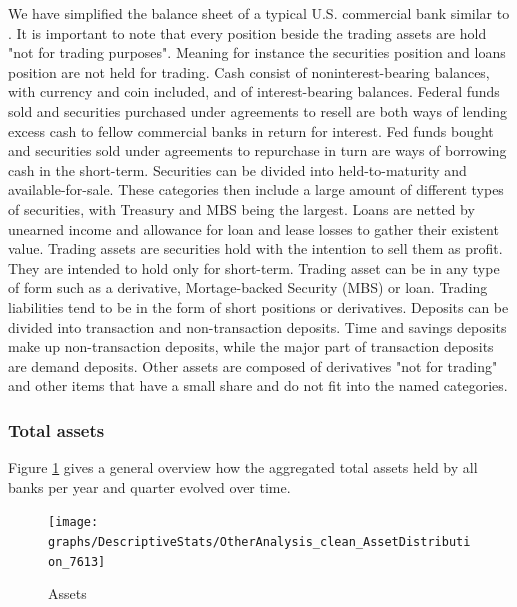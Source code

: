\documentclass[12pt, a4paper]{article} %
\begin{document}
We have simplified the balance sheet of a typical U.S. commercial bank similar to \citet{DrechslerSchnabel2017}.
It is important to note that every position beside the trading assets are hold "not for trading purposes". Meaning for instance the securities position and loans position are not held for trading.
Cash consist of noninterest-bearing balances, with currency and coin included, and of interest-bearing balances.
Federal funds sold and securities purchased under agreements to resell are both ways of lending excess cash to fellow commercial banks in return for interest. Fed funds bought and securities sold under agreements to repurchase in turn are ways of borrowing cash in the short-term. Securities can be divided into held-to-maturity and available-for-sale. These categories then include a large amount of different types of securities, with Treasury and MBS being the largest. Loans are netted by unearned income and allowance for loan and lease losses to gather their existent value. Trading assets are securities hold with the intention to sell them as profit. They are intended to hold only for short-term. Trading asset can be in any type of form such as a derivative, Mortage-backed Security (MBS) or loan. Trading liabilities tend to be in the form of short positions or derivatives. Deposits can be divided into transaction and non-transaction deposits. Time and savings deposits make up non-transaction deposits, while the major part of transaction deposits are demand deposits. Other assets are composed of derivatives "not for trading" and other items that have a small share and do not fit into the named categories.
 
\subsubsection{Total assets}
Figure \ref{fig:assets} gives a general overview how the aggregated total assets held by all banks per year and quarter evolved over time. 
 
\begin{figure}[H]
\begin{minipage}{\textwidth}
\texttt{[image: graphs/DescriptiveStats/OtherAnalysis\_clean\_AssetDistribution\_7613]}
\caption[1]{Assets}
\label{fig:assets}
\end{minipage}
\end{figure} 
 
\end{document}
